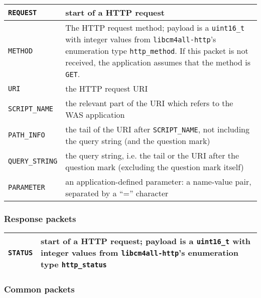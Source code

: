 \documentclass[a4paper,12pt]{article}
\begin{document}
\begin{longtable}{|l|p{10cm}|}
\hline

\texttt{REQUEST} & start of a HTTP request \\

\hline

\texttt{METHOD} & The HTTP request method; payload is a
\texttt{uint16\_t} with integer values from \texttt{libcm4all-http}'s
enumeration type \texttt{http\_method}.  If this packet is not
received, the application assumes that the method is \texttt{GET}. \\

\hline

\texttt{URI} & the HTTP request URI \\

\hline

\texttt{SCRIPT\_NAME} & the relevant part of the URI which refers to
the WAS application \\

\hline

\texttt{PATH\_INFO} & the tail of the URI after \texttt{SCRIPT\_NAME},
not including the query string (and the question mark) \\

\hline

\texttt{QUERY\_STRING} & the query string, i.e. the tail or the URI
after the question mark (excluding the question mark itself) \\

\hline

\texttt{PARAMETER} & an application-defined parameter: a name-value
pair, separated by a ``='' character \\

\hline
\end{longtable}

\subsubsection{Response packets}

\begin{longtable}{|l|p{10cm}|}
\hline

\texttt{STATUS} & start of a HTTP request; payload is a
\texttt{uint16\_t} with integer values from \texttt{libcm4all-http}'s
enumeration type \texttt{http\_status} \\

\hline
\end{longtable}

\subsubsection{Common packets}
\end{document}
